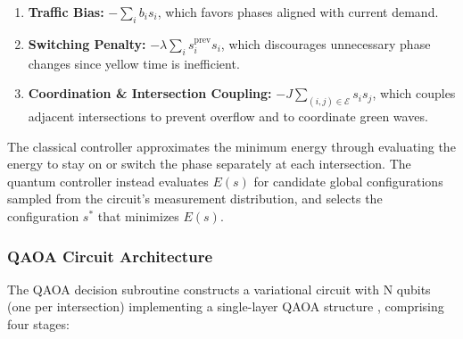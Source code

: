 \documentclass[12pt]{article}
\begin{document}
\begin{enumerate}
    \item \textbf{Traffic Bias:} $-\sum_i b_i s_i$, which favors phases aligned with current demand.


    \item \textbf{Switching Penalty:} $-\lambda \sum_i s_i^{\text{prev}} s_i$, which discourages unnecessary phase changes since yellow time is inefficient.

    \item \textbf{Coordination \& Intersection Coupling:} $-J\sum_{(i,j)\in\mathcal{E}} s_i s_j$, which couples adjacent intersections to prevent overflow and to coordinate green waves.
\end{enumerate}

The classical controller approximates the minimum energy through evaluating the energy to stay on or switch the phase separately at each intersection. The quantum controller instead evaluates $E(s)$ for candidate global configurations sampled from the circuit's measurement distribution, and selects the configuration $s^*$ that minimizes $E(s)$.

\subsubsection{QAOA Circuit Architecture}

The QAOA decision subroutine constructs a variational circuit with N qubits (one per intersection) implementing a single-layer QAOA structure \cite{farhi2014}, comprising four stages:
\end{document}
